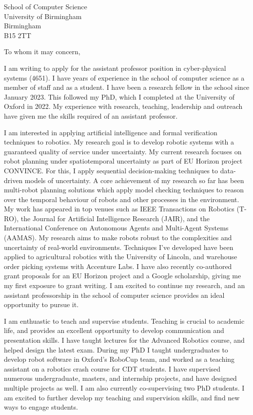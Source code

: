 \documentclass[12pt]{letter}
\begin{document}
\begin{letter}{School of Computer Science \\ University of Birmingham \\ Birmingham \\ B15 2TT}
\opening{To whom it may concern,}


I am writing to apply for the assistant professor position in cyber-physical systems (4651).
%
I have years of experience in the school of computer science as a member of staff and as a student.
%
I have been a research fellow in the school since January 2023.
%
This followed my PhD, which I completed at the University of Oxford in 2022.
%
My experience with research, teaching, leadership and outreach have given me the skills required of an assistant professor.



I am interested in applying artificial intelligence and formal verification techniques to robotics.
%
My research goal is to develop robotic systems with a guaranteed quality of service under uncertainty.
%
My current research focuses on robot planning under spatiotemporal uncertainty as part of EU Horizon project CONVINCE.
%
For this, I apply sequential decision-making techniques to data-driven models of uncertainty.
%
A core achievement of my research so far has been multi-robot planning solutions which apply model checking techniques to reason over the temporal behaviour of robots and other processes in the environment.
%
My work has appeared in top venues such as IEEE Transactions on Robotics (T-RO), the Journal for Artificial Intelligence Research (JAIR), and the International Conference on Autonomous Agents and Multi-Agent Systems (AAMAS).
%
My research aims to make robots robust to the complexities and uncertainty of real-world environments.
%
Techniques I've developed have been applied to agricultural robotics with the University of Lincoln, and warehouse order picking systems with Accenture Labs.
%
I have also recently co-authored grant proposals for an EU Horizon project and a Google scholarship, giving me my first exposure to grant writing.
%
I am excited to continue my research, and an assistant professorship in the school of computer science provides an ideal opportunity to pursue it.

I am enthuastic to teach and supervise students.
%
Teaching is crucial to academic life, and provides an excellent opportunity to develop communication and presentation skills.
%
I have taught lectures for the Advanced Robotics course, and helped design the latest exam.
%
During my PhD I taught undergraduates to develop robot software in Oxford's RoboCup team, and worked as a teaching assistant on a robotics crash course for CDT students.
%
I have supervised numerous undergraduate, masters, and internship projects, and have designed multiple projects as well.
%
I am also currently co-supervising two PhD students.
%
I am excited to further develop my teaching and supervision skills, and find new ways to engage students.


\end{letter}
\end{document}
